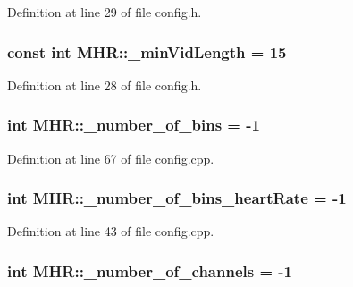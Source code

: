 Definition at line 29 of file config.\+h.

\hypertarget{namespace_m_h_r_aced573ebf5ae641d5c3a58c9762462fb}{
\subsubsection[{\+\_\+min\+Vid\+Length}]{\setlength{\rightskip}{0pt plus 5cm}const int M\+H\+R\+::\+\_\+min\+Vid\+Length = 15}}\label{namespace_m_h_r_aced573ebf5ae641d5c3a58c9762462fb}


Definition at line 28 of file config.\+h.

\hypertarget{namespace_m_h_r_ab3a5de59c2eed470e94ca0e79abd2b5c}{
\subsubsection[{\+\_\+number\+\_\+of\+\_\+bins}]{\setlength{\rightskip}{0pt plus 5cm}int M\+H\+R\+::\+\_\+number\+\_\+of\+\_\+bins = -\/1}}\label{namespace_m_h_r_ab3a5de59c2eed470e94ca0e79abd2b5c}


Definition at line 67 of file config.\+cpp.

\hypertarget{namespace_m_h_r_a5a4548440538bf0354499b42e7983f2f}{
\subsubsection[{\+\_\+number\+\_\+of\+\_\+bins\+\_\+heart\+Rate}]{\setlength{\rightskip}{0pt plus 5cm}int M\+H\+R\+::\+\_\+number\+\_\+of\+\_\+bins\+\_\+heart\+Rate = -\/1}}\label{namespace_m_h_r_a5a4548440538bf0354499b42e7983f2f}


Definition at line 43 of file config.\+cpp.

\hypertarget{namespace_m_h_r_a2ff626868d0be78114be4abbcd0ba01b}{
\subsubsection[{\+\_\+number\+\_\+of\+\_\+channels}]{\setlength{\rightskip}{0pt plus 5cm}int M\+H\+R\+::\+\_\+number\+\_\+of\+\_\+channels = -\/1}}\label{namespace_m_h_r_a2ff626868d0be78114be4abbcd0ba01b}


